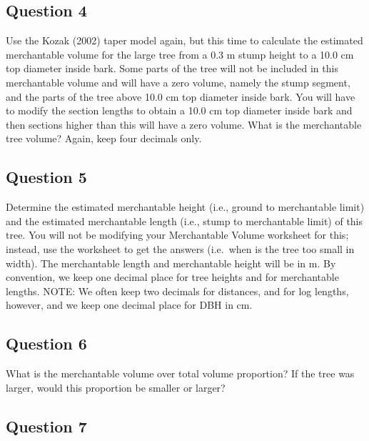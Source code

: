 \documentclass[
  letterpaper,
]{book}
\begin{document}

\hypertarget{question-4-4}{%
\subsection*{Question 4}\label{question-4-4}}

Use the Kozak (2002) taper model again, but this time to calculate the
estimated merchantable volume for the large tree from a 0.3 m stump
height to a 10.0 cm top diameter inside bark. Some parts of the tree
will not be included in this merchantable volume and will have a zero
volume, namely the stump segment, and the parts of the tree above 10.0
cm top diameter inside bark. You will have to modify the section lengths
to obtain a 10.0 cm top diameter inside bark and then sections higher
than this will have a zero volume. What is the merchantable tree volume?
Again, keep four decimals only.

\hypertarget{question-5-4}{%
\subsection*{Question 5}\label{question-5-4}}

Determine the estimated merchantable height (i.e., ground to
merchantable limit) and the estimated merchantable length (i.e., stump
to merchantable limit) of this tree. You will not be modifying your
Merchantable Volume worksheet for this; instead, use the worksheet to
get the answers (i.e.~when is the tree too small in width). The
merchantable length and merchantable height will be in m. By convention,
we keep one decimal place for tree heights and for merchantable lengths.
NOTE: We often keep two decimals for distances, and for log lengths,
however, and we keep one decimal place for DBH in cm.

\hypertarget{question-6-2}{%
\subsection*{Question 6}\label{question-6-2}}

What is the merchantable volume over total volume proportion? If the
tree was larger, would this proportion be smaller or larger?

\hypertarget{question-7-2}{%
\subsection*{Question 7}\label{question-7-2}}
\end{document}
